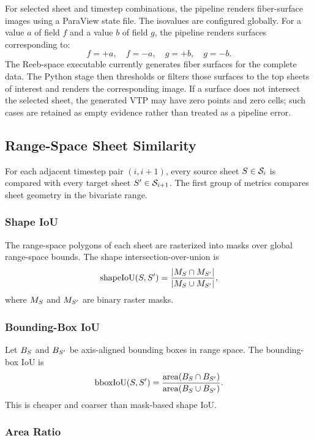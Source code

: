 For selected sheet and timestep combinations, the pipeline renders
fiber-surface images using a ParaView state file. The isovalues are configured
globally. For a value \(a\) of field \(f\) and a value \(b\) of field \(g\),
the pipeline renders surfaces corresponding to:
\[
f=+a,\quad f=-a,\quad g=+b,\quad g=-b.
\]
The Reeb-space executable currently generates fiber surfaces for the complete
data. The Python stage then thresholds or filters those surfaces to the top
sheets of interest and renders the corresponding image. If a surface does not
intersect the selected sheet, the generated VTP may have zero points and zero
cells; such cases are retained as empty evidence rather than treated as a
pipeline error.

\subsection{Range-Space Sheet Similarity}

For each adjacent timestep pair \((i,i+1)\), every source sheet
\(S\in\mathcal{S}_i\) is compared with every target sheet
\(S'\in\mathcal{S}_{i+1}\). The first group of metrics compares sheet
geometry in the bivariate range.

\subsubsection{Shape IoU}

The range-space polygons of each sheet are rasterized into masks over global
range-space bounds. The shape intersection-over-union is
\[
\operatorname{shapeIoU}(S,S') =
\frac{|M_S\cap M_{S'}|}{|M_S\cup M_{S'}|},
\]
where \(M_S\) and \(M_{S'}\) are binary raster masks.

\subsubsection{Bounding-Box IoU}

Let \(B_S\) and \(B_{S'}\) be axis-aligned bounding boxes in range
space. The bounding-box IoU is
\[
\operatorname{bboxIoU}(S,S') =
\frac{\operatorname{area}(B_S\cap B_{S'})}
{\operatorname{area}(B_S\cup B_{S'})}.
\]
This is cheaper and coarser than mask-based shape IoU.

\subsubsection{Area Ratio}

